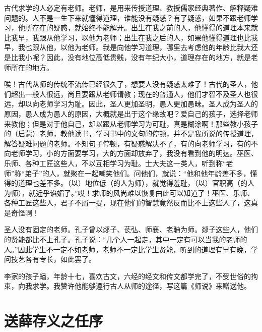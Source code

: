 \documentclass[12pt,UTF-8,openany,a4]{ctexbook}
\begin{document}
\begin{large}
    \yiwen 
    古代求学的人必定有老师。老师，是用来传授道理、教授儒家经典著作、解释疑难问题的。人不是一生下来就懂得道理，谁能没有疑惑？有了疑惑，如果不跟老师学习，他所存在的疑惑，就始终不能解开。出生在我之前的人，他懂得的道理本来就比我早，我跟从他学习，以他为老师；出生在我之后的人，如果他懂得道理也比我早，我也跟从他，以他为老师。我是向他学习道理，哪里去考虑他的年龄比我大还是比我小呢？因此，没有地位高低贵贱，没有年纪大小，道理存在的地方，就是老师所在的地方。
    
    唉！古代从师的传统不流传已经很久了，想要人没有疑惑太难了！古代的圣人，他们超出一般人很远，尚且要跟从老师请教；现在的普通人，他们才智不及圣人也很远，却以向老师学习为耻。因此，圣人更加圣明，愚人更加愚昧。圣人成为圣人的原因，愚人成为愚人的原因，大概就是出于这个缘故吧？爱自己的孩子，选择老师来教他；但是对于他自己，却以跟从老师学习为可耻，真是糊涂啊！那些教小孩子的（启蒙）老师，教他读书，学习书中的文句的停顿，并不是我所说的传授道理，解答疑难问题的老师。不知句子停顿，有疑惑解决不了，有的向老师学习，有的不向老师学习，小的方面要学习，大的方面却放弃了，我没有看到他的明达。巫医、乐师、各种工匠这些人，不以互相学习为耻。士大夫这一类人，听到称“老师”称“弟子”的人，就聚在一起嘲笑他们。问他们，就说：“他和他年龄差不多，懂得的道理也差不多。（以）地位低（的人为师），就觉得羞耻，（以）官职高（的人为师），就近乎谄媚了。”哎！求师的风尚难以恢复由此可以知道了！巫医、乐师、各种工匠这些人，君子不屑一提，现在他们的智慧竟然反而比不上这些人了，这真是奇怪啊！
    
    圣人没有固定的老师。孔子曾以郯子、苌弘、师襄、老聃为师。郯子这些人，他们的贤能都比不上孔子。孔子说：“几个人一起走，其中一定有可以当我的老师的人。”因此学生不一定不如老师，老师不一定比学生贤能，听到的道理有早有晚，学问技艺各有专长，如此罢了。
    
    李家的孩子蟠，年龄十七，喜欢古文，六经的经文和传文都学完了，不受世俗的拘束，向我求学。我赞许他能够遵行古人从师的途径，写这篇《师说》来赠送他。
    
\end{large}



\chapter{送薛存义之任序}
\end{document}
